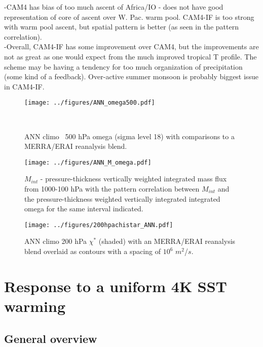 \documentclass[letterpaper,12pt,titlepage,oneside,final]{book}
\begin{document}
-CAM4 has bias of too much ascent of Africa/IO - does not have good representation of core of ascent over W. Pac. warm pool. CAM4-IF is too strong with warm pool ascent, but spatial pattern is better (as seen in the pattern correlation).
\\
-Overall, CAM4-IF has some improvement over CAM4, but the improvements are not as great as one would expect from the much improved tropical T profile. The scheme may be having a tendency for too much organization of precipitation (some kind of a feedback). Over-active summer monsoon is probably biggest issue in CAM4-IF.
\\
\begin{figure}[H]
\centering
\noindent\texttt{[image: ../figures/ANN\_omega500.pdf]}\hfill
\caption{ANN climo ~500 hPa omega (sigma level 18) with comparisons to a MERRA/ERAI reanalysis blend.}\
\label{fig:omega}
\end{figure}
\begin{figure}[H]
\centering
\noindent\texttt{[image: ../figures/ANN\_M\_omega.pdf]}\hfill
\caption{$M_{int}$ - pressure-thickness vertically weighted integrated mass flux from 1000-100 hPa with the pattern correlation between $M_{int}$ and the pressure-thickness weighted vertically integrated integrated omega for the same interval indicated.}
\label{fig:mcomeg}
\end{figure}
\newpage
\begin{figure}[H]
\centering
\noindent\texttt{[image: ../figures/200hpachistar\_ANN.pdf]}\hfill
\caption{ANN climo 200 hPa $\chi^{*}$ (shaded) with an MERRA/ERAI reanalysis blend overlaid as contours with a spacing of $10^{6}$ $m^{2}$/$s$.}
\end{figure}
\section{Response to a uniform 4K SST warming}

\subsection{General overview}
\end{document}
